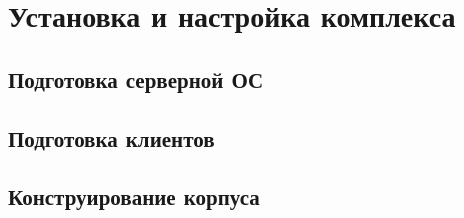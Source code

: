\section{Установка и настройка комплекса}

\subsection{Подготовка серверной ОС}

\subsection{Подготовка клиентов}

\subsection{Конструирование корпуса}
